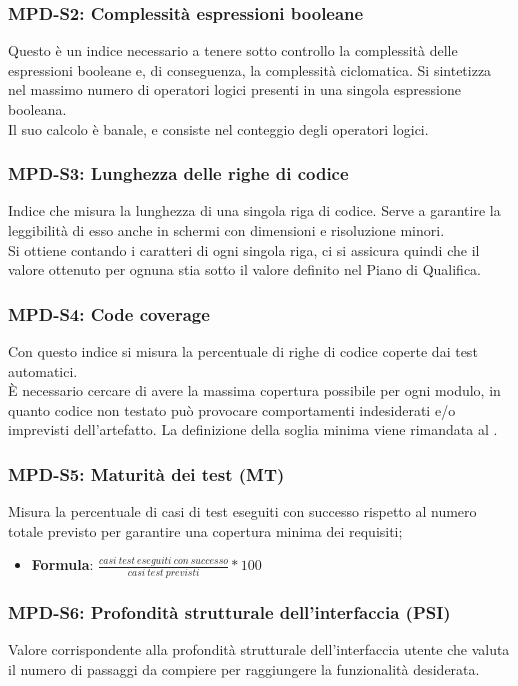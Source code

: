 \subsubsection{MPD-S2: Complessità espressioni booleane}
Questo è un indice necessario a tenere sotto controllo la complessità delle espressioni booleane e, di conseguenza, la complessità ciclomatica.
Si sintetizza nel massimo numero di operatori logici presenti in una singola espressione booleana.\\
Il suo calcolo è banale, e consiste nel conteggio degli operatori logici.

\subsubsection{MPD-S3: Lunghezza delle righe di codice}
Indice che misura la lunghezza di una singola riga di codice. Serve a garantire la leggibilità di esso anche in schermi
con dimensioni e risoluzione minori.\\
Si ottiene contando i caratteri di ogni singola riga, ci si assicura quindi che il valore ottenuto per ognuna stia sotto il valore
definito nel Piano di Qualifica.

\subsubsection{MPD-S4: Code coverage}
Con questo indice si misura la percentuale di righe di codice coperte dai test automatici.\\
È necessario cercare di avere la massima copertura possibile per ogni modulo, in quanto codice non testato
può provocare comportamenti indesiderati e/o imprevisti dell'artefatto. La definizione della soglia minima viene rimandata al .


\subsubsection{MPD-S5: Maturità dei test (MT)}
Misura la percentuale di casi di test eseguiti con successo rispetto al numero totale previsto per garantire una copertura minima dei requisiti;
\begin{itemize}
    \item \textbf{Formula}: \(\frac{casi\ test\ eseguiti\ con\ successo}{casi\ test\ previsti}*100\)
    
\end{itemize}

\subsubsection{MPD-S6: Profondità strutturale dell'interfaccia (PSI)}
Valore corrispondente alla profondità strutturale dell'interfaccia utente che valuta il numero di passaggi da compiere per raggiungere la funzionalità desiderata.